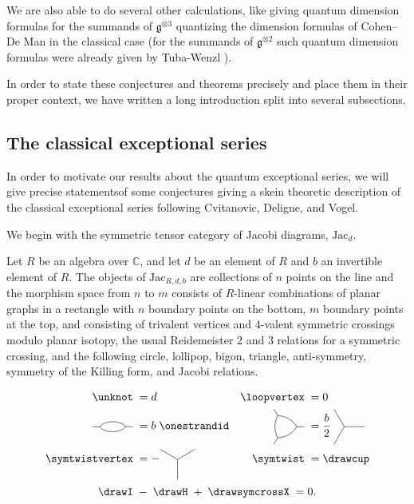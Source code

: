 \documentclass[12pt]{amsart}
\begin{document}
We are also able to do several other calculations, like giving quantum dimension formulas for the summands of $\mathfrak{g}^{\otimes 3}$ quantizing the dimension formulas of Cohen--De Man \cite{MR1381778} in the classical case (for the summands of $\mathfrak{g}^{\otimes 2}$ such quantum dimension formulas were already given by Tuba-Wenzl \cite{MR2132671}).

In order to state these conjectures and theorems precisely and place them in their proper context, we have written a  long introduction split into several subsections.

\subsection{The classical exceptional series}
In order to motivate our results about the quantum exceptional series, we will give precise statementsof some conjectures giving a skein theoretic description of the classical exceptional series following Cvitanovic, Deligne, and Vogel.

We begin with the symmetric tensor category of Jacobi
diagrams, $\mathrm{Jac}_d$.

\begin{definition}
Let $R$ be an algebra over $\mathbb{C}$, and let $d$ be an element of $R$ and $b$ an invertible element of $R$.  The objects of $\mathrm{Jac}_{R,d,b}$ are collections of $n$ points on the line and
the morphism space from $n$ to $m$ consists of $R$-linear combinations
of planar
graphs in a rectangle with $n$ boundary points on the bottom, $m$ boundary
points at the top, and consisting of trivalent vertices and $4$-valent
symmetric crossings
modulo planar isotopy, the usual Reidemeister 2 and 3
relations for a symmetric crossing, and the following circle,
lollipop, bigon, triangle,
anti-symmetry, symmetry of the Killing form, and Jacobi relations.

\begin{align}
\label{eq:classical-loop-lollipop}  \unknot \; &= d &  \loopvertex \; &=0 \\
\label{eq:classical-bigon-trigon}  \ngon{2}\; &= b \;\onestrandid  & \ngon{3}\; &= \frac{b}{2} \;\nvertex{3} \\
\label{eq:classical-symmetry-antisymmetry}   \symtwistvertex\; &= - \nvertex[-90]{3} & \symtwist\; &= \drawcup
\end{align}
\begin{equation}
\drawI\; - \;\drawH\; + \;\drawsymcrossX\; = 0.
\label{eq:IHX}
\end{equation}
\end{definition}
\end{document}
